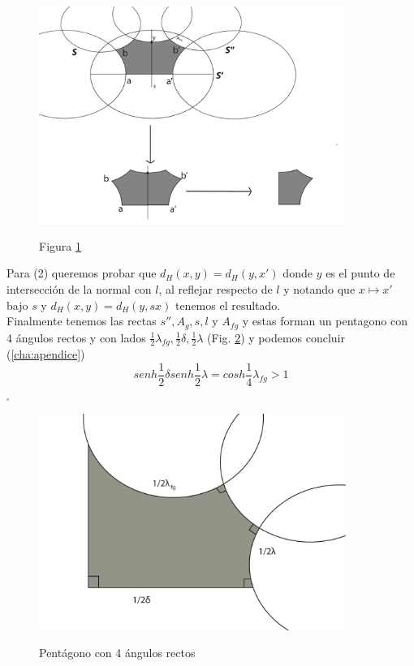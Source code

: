 \begin{figure}[h]
  \centering
  \includegraphics[width=10cm]{lemma1-dibujo6-2}\\
  \caption{Figura \ref{lemma1-dibujo6-2} }\label{lemma1-dibujo6-2}
\end{figure}


Para (2) queremos probar que $d_{H}(x,y) = d_{H}(y,x')$ donde $y$ es
el punto de intersecci\'on de la normal con $l$, al reflejar
respecto de $l$ y notando que $x \mapsto x'$ bajo $s$ y $d_{H}(x,y)
= d_{H}(y,sx)$ tenemos el resultado. \\


Finalmente tenemos las rectas $s'',A_{g},s,l$ y $A_{fg}$ y estas
forman un pentagono con 4 \'angulos rectos y con lados
$\frac{1}{2}\lambda_{fg},\frac{1}{2}\delta,\frac{1}{2}\lambda$
 (Fig. \ref{lemma1-dibujo9}) y podemos concluir (\ref{cha:apendice})
$$ senh \frac{1}{2} \delta senh \frac{1}{2} \lambda = cosh \frac{1}{4} \lambda_{fg} >1$$
$ _{\square} $

\begin{figure}[h]
  \centering
  \includegraphics[width=10cm]{lemma1-dibujo9}\\
  \caption{Pent\'agono con 4 \'angulos rectos}\label{lemma1-dibujo9}
\end{figure}



